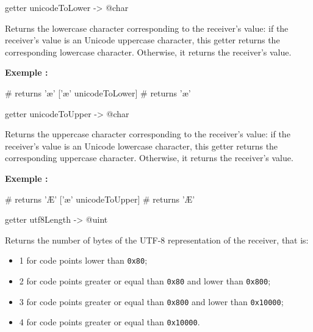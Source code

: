 
\begin{galgas}
getter unicodeToLower -> @char
\end{galgas}

Returns the lowercase character corresponding to the receiver's value: if the receiver's value is an Unicode uppercase character, this getter returns the corresponding lowercase character. Otherwise, it returns the receiver's value.

\textbf{Exemple :}
\begin{galgas}
['Æ' unicodeToLower] # returns 'æ'
['æ' unicodeToLower] # returns 'æ'
\end{galgas}





\begin{galgas}
getter unicodeToUpper -> @char
\end{galgas}

Returns the uppercase character corresponding to the receiver's value: if the receiver's value is an Unicode lowercase character, this getter returns the corresponding uppercase character. Otherwise, it returns the receiver's value.

\textbf{Exemple :}
\begin{galgas}
['Æ' unicodeToUpper] # returns 'Æ'
['æ' unicodeToUpper] # returns 'Æ'
\end{galgas}





\begin{galgas}
getter utf8Length -> @uint
\end{galgas}

Returns the number of bytes of the UTF-8 representation of the receiver, that is:
\begin{itemize}
  \item 1 for code points lower than \texttt{0x80};
  \item 2 for code points greater or equal than \texttt{0x80} and lower than \texttt{0x800};
  \item 3 for code points greater or equal than \texttt{0x800} and lower than \texttt{0x10000};
  \item 4 for code points greater or equal than \texttt{0x10000}.
\end{itemize}






